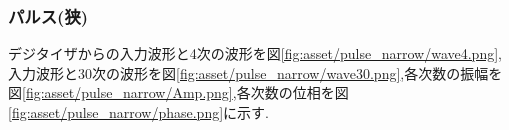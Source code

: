 \subsubsection{パルス(狭)}
デジタイザからの入力波形と4次の波形を図\ref{fig:asset/pulse_narrow/wave4.png},入力波形と30次の波形を図\ref{fig:asset/pulse_narrow/wave30.png},各次数の振幅を図\ref{fig:asset/pulse_narrow/Amp.png},各次数の位相を図\ref{fig:asset/pulse_narrow/phase.png}に示す.
\begin{figure}[htbp]
  \begin{minipage}{0.5\hsize}
  \end{minipage}
  \begin{minipage}{0.5\hsize}
  \end{minipage} 
\end{figure}
\begin{figure}[htbp]
  \begin{minipage}{0.5\hsize}
  \end{minipage}
  \begin{minipage}{0.5\hsize}
  \end{minipage} 
\end{figure}